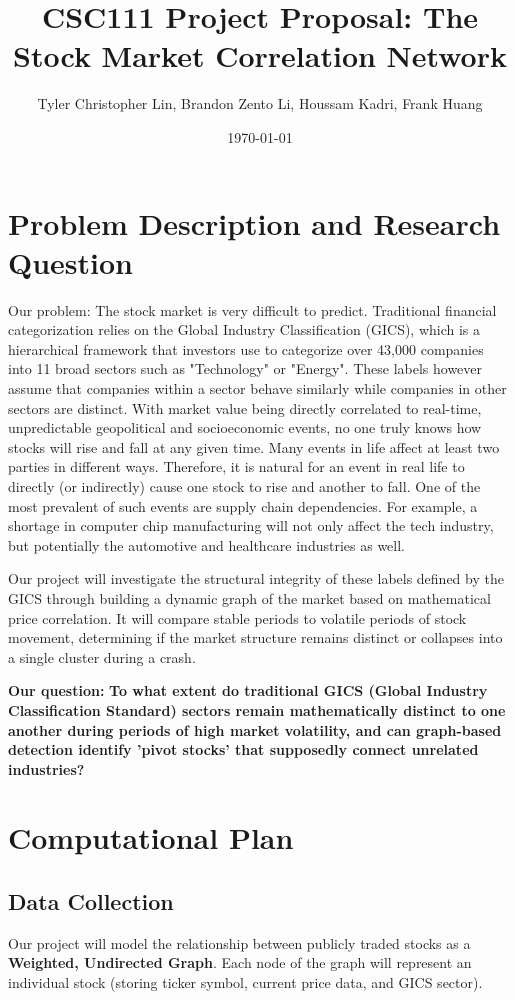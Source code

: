 \documentclass[fontsize=11pt]{article}
\title{\textbf{CSC111 Project Proposal: The Stock Market Correlation Network}}
\author{Tyler Christopher Lin, Brandon Zento Li, Houssam Kadri, Frank Huang}
\date{\today}
\begin{document}
\maketitle

\section*{Problem Description and Research Question}

Our problem: The stock market is very difficult to predict. Traditional financial categorization relies on the Global Industry Classification (GICS), which is a hierarchical framework that investors use to categorize over 43,000 companies into 11 broad sectors such as "Technology" or "Energy". These labels however assume that companies within a sector behave similarly while companies in other sectors are distinct. With market value being directly correlated to real-time, unpredictable geopolitical and socioeconomic events, no one truly knows how stocks will rise and fall at any given time. Many events in life affect at least two parties in different ways. Therefore, it is natural for an event in real life to directly (or indirectly) cause one stock to rise and another to fall. One of the most prevalent of such events are supply chain dependencies. For example, a shortage in computer chip manufacturing will not only affect the tech industry, but potentially the automotive and healthcare industries as well.

Our project will investigate the structural integrity of these labels defined by the GICS through building a dynamic graph of the market based on mathematical price correlation. It will compare stable periods to volatile periods of stock movement, determining if the market structure remains distinct or collapses into a single cluster during a crash.

\textbf{Our question:} \textbf{To what extent do traditional GICS (Global Industry Classification Standard) sectors remain mathematically distinct to one another during periods of high market volatility, and can graph-based detection identify 'pivot stocks' that supposedly connect unrelated industries?}

\section*{Computational Plan}

\subsection*{Data Collection}
Our project will model the relationship between publicly traded stocks as a \textbf{Weighted, Undirected Graph}. Each node of the graph will represent an individual stock (storing ticker symbol, current price data, and GICS sector).
\end{document}
